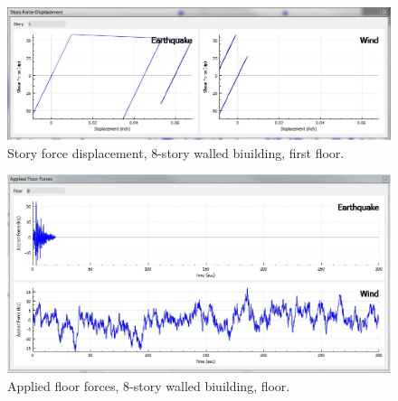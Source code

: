 \documentclass{simcenterdocumentation}
\begin{document}
\begin{figure}[H]
	\centering \includegraphics[scale=0.35]{8_walled_bldg_sfd.jpg}
	\caption{Story force displacement, 8-story walled biuilding, first floor.}
\end{figure}
\begin{figure}[H]
	\centering \includegraphics[scale=0.35]{8_walled_bldg_aff.jpg}
	\caption{Applied floor forces, 8-story walled biuilding,  floor.}
\end{figure}




\newpage
%
\end{document}
